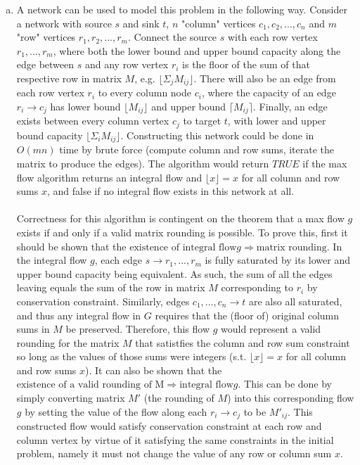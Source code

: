 \documentclass[11pt]{article}
\begin{document}



\begin{enumerate}[(a)]
    \item
    \begin{solution}
    A network can be used to model this problem in the following way. Consider a network with source $s$ and sink $t$, $n$ "column" vertices $c_1,c_2,...,c_n$ and $m$ "row" vertices $r_1,r_2,...,r_m$. Connect the source $s$ with each row vertex $r_1,...,r_m$, where both the lower bound and upper bound capacity along the edge between $s$ and any row vertex $r_i$ is the floor of the sum of that respective row in matrix $M$, e.g. $\lfloor \Sigma_{j} M_{ij} \rfloor$. There will also be an edge from each row vertex $r_i$ to every column node $c_i$, where the capacity of an edge $r_i \to c_j$ has lower bound $\lfloor M_{ij} \rfloor$ and upper bound $\lceil M_{ij} \rceil$. Finally, an edge exists between every column vertex $c_j$ to target $t$, with lower and upper bound capacity $\lfloor \Sigma_{i} M_{ij} \rfloor$. Constructing this network could be done in $O(mn)$ time by brute force (compute column and row sums, iterate the matrix to produce the edges). The algorithm would return $TRUE$ if the max flow algorithm returns an integral flow and $\lfloor x \rfloor = x$ for all column and row sums $x$, and false if no integral flow exists in this network at all. \\ \\
        Correctness for this algorithm is contingent on the theorem that a max flow $g$ exists if and only if a valid matrix rounding is possible. To prove this, first it should be shown that the $\text{existence of integral flow} g \Rightarrow \text{matrix rounding}$. In the integral flow $g$, each edge $s \to r_1,...,r_m$ is fully saturated by its lower and upper bound capacity being equivalent. As such, the sum of all the edges leaving equals the sum of the row in matrix $M$ corresponding to $r_i$ by conservation constraint. Similarly, edges $c_1,...,c_n \to t$ are also all saturated, and thus any integral flow in $G$ requires that the (floor of) original column sums in $M$ be preserved. Therefore, this flow $g$ would represent a valid rounding for the matrix $M$ that satistfies the column and row sum constraint so long as the values of those sums were integers (s.t. $\lfloor x \rfloor = x$ for all column and row sums $x$). It can also be shown that the $\text{existence of a valid rounding of M} \Rightarrow \text{integral flow} g$. This can be done by simply converting matrix $M'$ (the rounding of $M$) into this corresponding flow $g$ by setting the value of the flow along each $r_i \to c_j$ to be $M'_{ij}$. This constructed flow would satisfy conservation constraint at each row and column vertex by virtue of it satisfying the same constraints in the initial problem, namely it must not change the value of any row or column sum $x$. \\ \\

\end{solution}
\end{enumerate}
\end{document}
